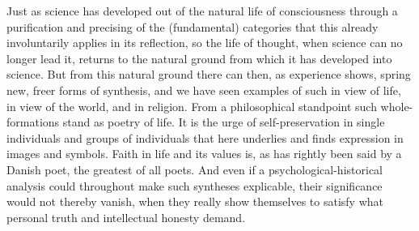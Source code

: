 \documentclass[12pt]{book}
\newcommand{\opage}[1]{\marginnote{\footnotesize\textit{[#1]}}}
\begin{document}
Just as science has developed out of the natural life of consciousness through a purification and
precising of the \opage{118}(fundamental) categories that this already involuntarily applies in its reflection, so the
life of thought, when science can no longer lead it, returns to the natural ground from which it has
developed into science. But from this natural ground there can then, as experience shows, spring new, freer
forms of synthesis, and we have seen examples of such in view of life, in view of the world, and in
religion. From a philosophical standpoint such whole-formations stand as poetry of life. It is the urge of
self-preservation in single individuals and groups of individuals that here underlies and finds expression
in images and symbols. Faith in life and its values is, as has rightly been said by a Danish poet, the
greatest of all poets. And even if a psychological-historical analysis could throughout make such syntheses
explicable, their significance would not thereby vanish, when they really show themselves to satisfy what
personal truth and intellectual honesty demand.
\end{document}
